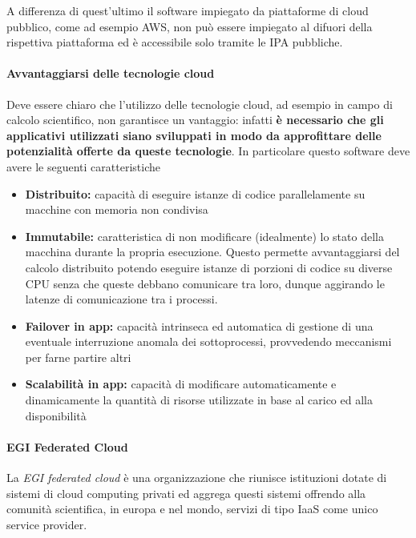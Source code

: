 A differenza di quest'ultimo il software impiegato da piattaforme di
cloud pubblico, come ad esempio AWS, non può essere impiegato al difuori
della rispettiva piattaforma ed è accessibile solo tramite le IPA
pubbliche.

\paragraph{Avvantaggiarsi delle tecnologie
cloud}\label{avvantaggiarsi-delle-tecnologie-cloud}

Deve essere chiaro che l'utilizzo delle tecnologie cloud, ad esempio in
campo di calcolo scientifico, non garantisce un vantaggio: infatti
\textbf{è necessario che gli applicativi utilizzati siano sviluppati in
modo da approfittare delle potenzialità offerte da queste tecnologie}.
In particolare questo software deve avere le seguenti caratteristiche

\begin{itemize}
\tightlist
\item
  \textbf{Distribuito:} capacità di eseguire istanze di codice
  parallelamente su macchine con memoria non condivisa
\item
  \textbf{Immutabile:} caratteristica di non modificare (idealmente) lo
  stato della macchina durante la propria esecuzione. Questo permette
  avvantaggiarsi del calcolo distribuito potendo eseguire istanze di
  porzioni di codice su diverse CPU senza che queste debbano comunicare
  tra loro, dunque aggirando le latenze di comunicazione tra i processi.
\item
  \textbf{Failover in app:} capacità intrinseca ed automatica di
  gestione di una eventuale interruzione anomala dei sottoprocessi,
  provvedendo meccanismi per farne partire altri
\item
  \textbf{Scalabilità in app:} capacità di modificare automaticamente e
  dinamicamente la quantità di risorse utilizzate in base al carico ed
  alla disponibilità
\end{itemize}

\paragraph{EGI Federated Cloud}\label{egi-federated-cloud}

La \emph{EGI federated cloud} è una organizzazione che riunisce
istituzioni dotate di sistemi di cloud computing privati ed aggrega
questi sistemi offrendo alla comunità scientifica, in europa e nel
mondo, servizi di tipo IaaS come unico service provider.


